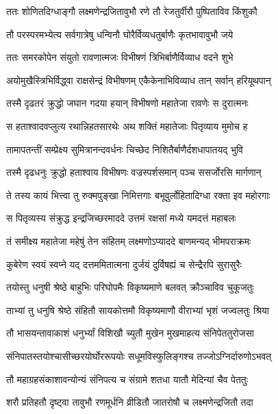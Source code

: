 \twolineshloka
{ततः शोणितदिग्धाङ्गौ लक्ष्मणेन्द्रजितावुभौ}
{रणे तौ रेजतुर्वीरौ पुष्पिताविव किंशुकौ} %

\twolineshloka
{तौ परस्परमभ्येत्य सर्वगात्रेषु धन्विनौ}
{घोरैर्विव्यधतुर्बाणैः कृतभावावुभौ जये} %

\twolineshloka
{ततः समरकोपेन संयुतो रावणात्मजः}
{विभीषणं त्रिभिर्बाणैर्विव्याध वदने शुभे} %

\twolineshloka
{अयोमुखैस्त्रिभिर्विद्ध्वा राक्षसेन्द्रं विभीषणम्}
{एकैकेनाभिविव्याध तान् सर्वान् हरियूथपान्} %

\twolineshloka
{तस्मै दृढतरं क्रुद्धो जघान गदया हयान्}
{विभीषणो महातेजा रावणेः स दुरात्मनः} %

\twolineshloka
{स हताश्वादवप्लुत्य रथान्निहतसारथेः}
{अथ शक्तिं महातेजाः पितृव्याय मुमोच ह} %

\twolineshloka
{तामापतन्तीं सम्प्रेक्ष्य सुमित्रानन्दवर्धनः}
{चिच्छेद निशितैर्बाणैर्दशधापातयद् भुवि} %

\twolineshloka
{तस्मै दृढधनुः क्रुद्धो हताश्वाय विभीषणः}
{वज्रस्पर्शसमान् पञ्च ससर्जोरसि मार्गणान्} %

\twolineshloka
{ते तस्य कायं भित्त्वा तु रुक्मपुङ्खा निमित्तगाः}
{बभूवुर्लोहितादिग्धा रक्ता इव महोरगाः} %

\twolineshloka
{स पितृव्यस्य संक्रुद्ध इन्द्रजिच्छरमाददे}
{उत्तमं रक्षसां मध्ये यमदत्तं महाबलः} %

\twolineshloka
{तं समीक्ष्य महातेजा महेषुं तेन संहितम्}
{लक्ष्मणोऽप्याददे बाणमन्यद् भीमपराक्रमः} %

\twolineshloka
{कुबेरेण स्वयं स्वप्ने यद् दत्तममितात्मना}
{दुर्जयं दुर्विषह्यं च सेन्द्रैरपि सुरासुरैः} %

\twolineshloka
{तयोस्तु धनुषी श्रेष्ठे बाहुभिः परिघोपमैः}
{विकृष्यमाणे बलवत् क्रौञ्चाविव चुकूजतुः} %

\twolineshloka
{ताभ्यां तु धनुषि श्रेष्ठे संहितौ सायकोत्तमौ}
{विकृष्यमाणौ वीराभ्यां भृशं जज्वलतुः श्रिया} %

\twolineshloka
{तौ भासयन्तावाकाशं धनुर्भ्यां विशिखौ च्युतौ}
{मुखेन मुखमाहत्य संनिपेततुरोजसा} %

\twolineshloka
{संनिपातस्तयोश्चासीच्छरयोर्घोररूपयोः}
{सधूमविस्फुलिङ्गश्च तज्जोऽग्निर्दारुणोऽभवत्} %

\twolineshloka
{तौ महाग्रहसंकाशावन्योन्यं संनिपत्य च}
{संग्रामे शतधा यातौ मेदिन्यां चैव पेततुः} %

\twolineshloka
{शरौ प्रतिहतौ दृष्ट्वा तावुभौ रणमूर्धनि}
{व्रीडितौ जातरोषौ च लक्ष्मणेन्द्रजितौ तदा} %


